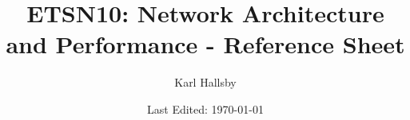 


% 

\DeclareMathOperator{\Prob}{\operatorname{P}}
\DeclareMathOperator{\Given}{\vert}
\DeclareMathOperator{\ExpectedValue}{\operatorname{\mathbb{E}}}
\DeclareMathOperator{\Variance}{\operatorname{VAR}}
\DeclareMathOperator{\StdDev}{\operatorname{STD}}
\DeclareMathOperator{\Covariance}{\operatorname{Cov}}
\DeclareMathOperator{\CorrCoeff}{\rho}

\newcommand{\SetOrder}[1]{\lvert #1 \rvert}

\begin{titlepage}
  \title{ETSN10: Network Architecture and Performance - Reference Sheet}
  \author{Karl Hallsby}
  \date{Last Edited: \today} %
\end{titlepage}


\maketitle
{} %
\tableofcontents
\clearpage
\listoftheorems[ignoreall, show={definition, Definition}]
\clearpage
{} %









